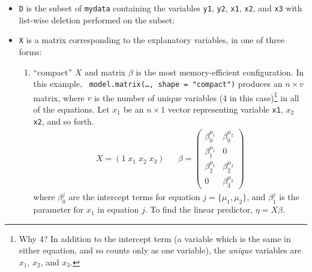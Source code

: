 \documentclass[oneside,letterpaper,12pt]{article}
\begin{document}
\begin{itemize}
\item  {\tt D} is the subset of {\tt mydata} containing the variables
{\tt y1}, {\tt y2}, {\tt x1}, {\tt x2}, and {\tt x3} with list-wise
deletion performed on the subset; 
\item {\tt X} is a matrix corresponding to the explanatory variables,
in one of three forms: 
\begin{enumerate}
\item ``compact'' $X$ and matrix $\beta$ is the most
memory-efficient configuration. In this example, {\tt
model.matrix(\dots, shape = "compact")} produces an $n \times v$
matrix, where $v$ is the number of unique variables (4 in this
case)\footnote{Why 4? In addition to the intercept term (a variable
which is the same in either equation, and so counts only as one
variable), the \emph{unique} variables are $x_1$, $x_2$, and $x_3$.} 
in all of the equations.  Let $x_1$ be an $n \times 1$ vector
representing variable {\tt x1}, $x_2$ {\tt x2}, and so forth.
\begin{eqnarray*}
X = (1 \; x_1 \; x_2 \; x_3) & & \beta = \left(
\begin{array}{cc}
\beta_0^{\mu_1}       & \beta_0^{\mu_2} \\
\beta_1^{\mu_1}       & 0 \\
\beta_2^{\mu_1}       & \beta_2^{\mu_2} \\
0                     & \beta_3^{\mu_2}
\end{array} \right) 
\end{eqnarray*}
where $\beta_0^j$ are the intercept terms for equation $j = \{\mu_1,
\mu_2\}$, and $\beta_1^j$ is the parameter for $x_1$ in equation $j$.
To find the linear predictor, $\eta = X \beta$.  


\end{enumerate}
\end{itemize}
\end{document}
